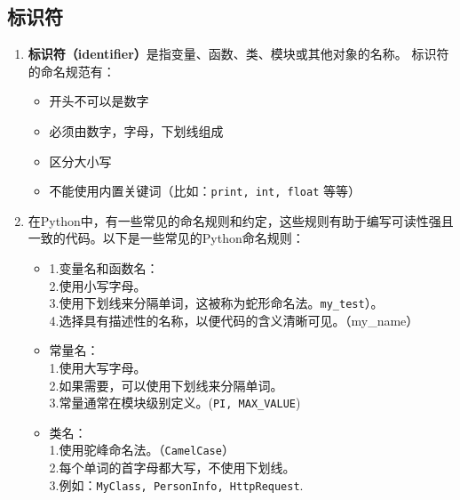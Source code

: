 
\begin{issues}
\issueDraft
\end{issues}

\subsection{标识符}

\begin{enumerate}
\item \textbf{标识符（identifier）}是指变量、函数、类、模块或其他对象的名称。 标识符的命名规范有：
\begin{itemize}
\item 开头不可以是数字
\item 必须由数字，字母，下划线组成
\item 区分大小写
\item 不能使用内置关键词（比如：\verb`print, int, float` 等等）
\end{itemize}
\item 在Python中，有一些常见的命名规则和约定，这些规则有助于编写可读性强且一致的代码。以下是一些常见的Python命名规则：
\begin{itemize}
\item
1.变量名和函数名：\\
2.使用小写字母。\\
3.使用下划线来分隔单词，这被称为蛇形命名法。\verb`my_test`）。\\
4.选择具有描述性的名称，以便代码的含义清晰可见。（my_name）

\item 常量名：\\
1.使用大写字母。\\
2.如果需要，可以使用下划线来分隔单词。\\
3.常量通常在模块级别定义。(\verb`PI, MAX_VALUE`)\\
\item 类名：\\
1.使用驼峰命名法。（\verb`CamelCase`）\\
2.每个单词的首字母都大写，不使用下划线。\\
3.例如：\verb`MyClass, PersonInfo, HttpRequest`.
\end{itemize}
\end{enumerate}